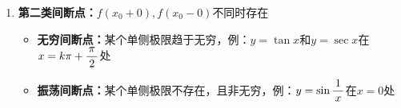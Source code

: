 \begin{enumerate}[(1)]
\begin{itemize}
\begin{center}
 	\end{center}
  \end{itemize}
  \item {\bf 第二类间断点：}$f(x_0+0),f(x_0-0)$不同时存在
  \begin{itemize}
    \item {\bf 无穷间断点：}某个单侧极限趋于无穷，例：$y=\tan x$和$y=\sec x$在$x=k\pi+\displaystyle\frac{\,{\pi}\,}{\,{2}\,}$处
     \begin{center}
 	\end{center}
    \item {\bf 振荡间断点：}某个单侧极限不存在，且非无穷，例：$y=\sin\displaystyle\frac{\,{1}\,}{\,{x}\,}$在$x=0$处
    \begin{center}

\end{center}
\end{itemize}
\end{enumerate}
